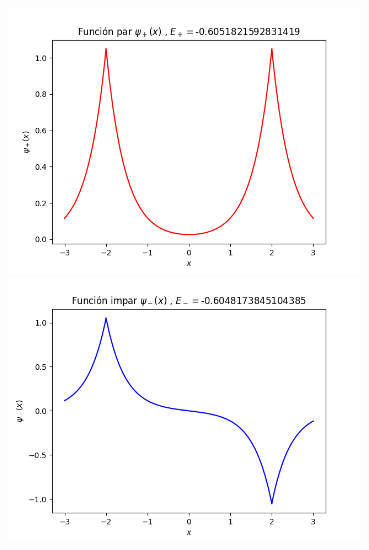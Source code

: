 \documentclass[10pt,a4papper]{article}
\begin{document}
\includegraphics[height=7cm]{psip.png}
\includegraphics[height=7cm]{psim.png}

\newpage

\newpage

\newpage

\newpage

\newpage

\newpage

\newpage

\newpage

\newpage

\newpage

\newpage

\newpage

\newpage

\newpage

\newpage

\newpage

\newpage

\newpage
\end{document}
